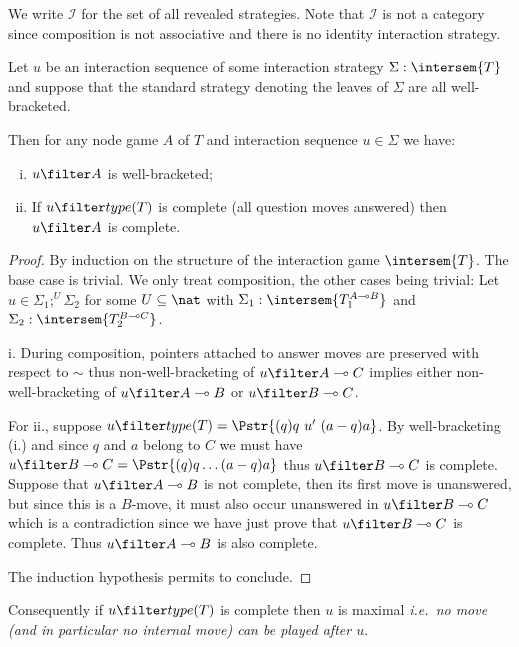 We write $\mathcal{I}$ for the set of all revealed strategies. Note
that $\mathcal{I}$ is not a category since composition is not
associative and there is no identity interaction strategy.


\begin{lemma}
\label{lem:inter_complete}
Let $u$ be an interaction sequence of some interaction strategy $\Sigma : \intersem{T}$
and suppose that the standard strategy denoting the leaves of $\Sigma$ are all well-bracketed.

Then for any node game $A$ of $T$ and interaction sequence $u\in
\Sigma$ we have:
\begin{enumerate}[i.]
\item $u \filter A$ is well-bracketed;

\item If $u \filter type(T)$ is complete (all question moves answered) then
    $u \filter A$ is complete.
\end{enumerate}
\end{lemma}
\begin{proof}
By induction on the structure of the interaction game $\intersem{T}$. The base case is
trivial. We only treat composition, the other cases being trivial: Let $ u \in \Sigma_1 ; ^U \Sigma_2$ for some $U \subseteq \nat$ with
$\Sigma_1 : \intersem{T_1^{A\multimap B}}$ and $\Sigma_2 : \intersem{T_2^{B\multimap C}}$.

i. During composition, pointers attached to answer moves are preserved with respect to $\sim$
thus non-well-bracketing of $u\filter A\multimap C$ implies
either non-well-bracketing of $u\filter A\multimap B$ or $u\filter B\multimap C$.

For ii., suppose $u \filter type(T) = \Pstr{(q)q\ u'\ (a-q)a }$.
By well-bracketing (i.) and since $q$ and $a$ belong to $C$ we must have
$u \filter B\multimap C = \Pstr{(q)q \ldots (a-q)a}$ thus $u \filter B\multimap C$ is complete.
Suppose that $u \filter A\multimap B$ is not complete, then its first move is unanswered,
but since this is a $B$-move, it must also occur unanswered in $u \filter B\multimap C$ which is a contradiction
since we have just prove that $u \filter B\multimap C$ is complete. Thus $u \filter A\multimap B$  is also complete.

The induction hypothesis permits to conclude.
\end{proof}
Consequently if $u\filter type(T)$ is complete then $u$ is maximal {\em i.e.~no move (and in particular no internal move) can be played after $u$}.

